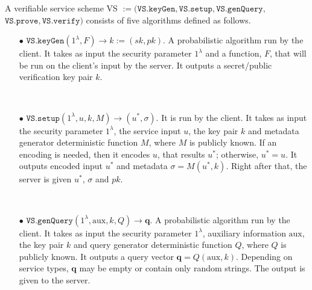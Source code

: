 \begin{definition}[VS Scheme]\label{service-def}
A verifiable service scheme VS $:=(\mathtt{VS.keyGen}, \mathtt{VS.setup},\mathtt{VS.genQuery},$ $\mathtt{VS.prove},\mathtt{VS.verify})$ consists of five algorithms defined as follows.


\begin{itemize}

\item[$\bullet$] $\mathtt{VS.keyGen}(1^{\lambda},F)\rightarrow k:=(sk,pk)$.  A probabilistic algorithm run by the client. It takes as input the security parameter $1^{\lambda}$ and a function, $F$, that will be run on the client's input by the server. It outputs a secret/public verification key pair $k$. 

\

\item[$\bullet$] $\mathtt{VS.setup}(1^{\lambda}, u,k, M)\rightarrow (u^{\scriptscriptstyle *},\sigma)$. It is run by the client. It takes as input the security parameter $1^{\lambda}$,  the service input $u$,  the key pair $k$ and metadata generator deterministic function $M$, where $M$ is publicly known. If an encoding is needed, then it encodes $u$, that results $u^{\scriptscriptstyle *}$; otherwise, $u^*=u$. It outputs encoded input $u^{\scriptscriptstyle *}$ and metadata $\sigma=M(u^{\scriptscriptstyle *},k)$. Right after that, the server is  given $u^{\scriptscriptstyle *}$,  $\sigma$ and $pk$. %



\

\item[$\bullet$] $\mathtt{VS.genQuery}(1^{\lambda}, \text{aux},k,Q)\rightarrow \bm{q}$. A probabilistic algorithm run by the client. It takes as input the security parameter $1^{\lambda}$, auxiliary information $\text{aux}$,  the key pair $k$  and query generator deterministic function $Q$, where $Q$ is publicly known. It outputs  a query vector $\bm{q}=Q( \text{aux},k)$.  Depending on service types, $\bm{q}$ may be empty or contain only random strings. The output  is given to the server. 


\end{itemize}
\end{definition}
